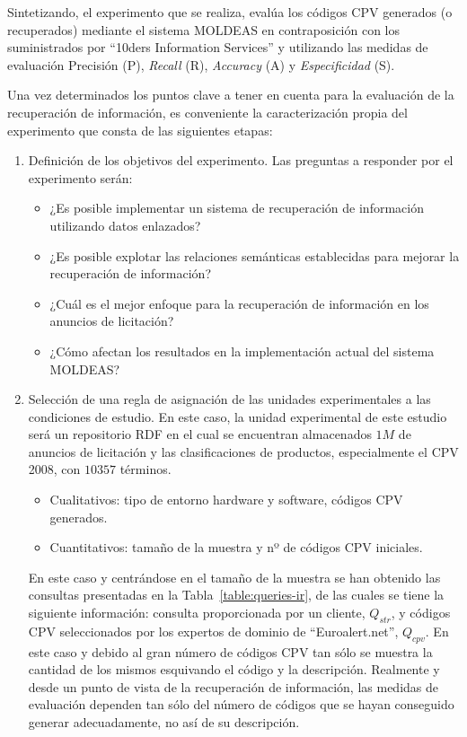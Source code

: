 Sintetizando, el experimento que se realiza, evalúa los códigos CPV generados (o recuperados) mediante el sistema MOLDEAS en contraposición 
con los suministrados por ``10ders Information Services'' y utilizando las medidas de evaluación Precisión (P), \textit{Recall} (R), \textit{Accuracy} (A) y 
\textit{Especificidad} (S).

Una vez determinados los puntos clave a tener en cuenta para la evaluación de la recuperación de información, es conveniente la caracterización 
propia del experimento que consta de las siguientes etapas:
\begin{enumerate}
 \item Definición de los objetivos del experimento. Las preguntas a responder por el experimento serán:
\begin{itemize}
 \item ¿Es posible implementar un sistema de recuperación de información utilizando datos enlazados?
 \item ¿Es posible explotar las relaciones semánticas establecidas para mejorar la recuperación de información?
 \item ¿Cuál es el mejor enfoque para la recuperación de información en los anuncios de licitación? 
 \item ¿Cómo afectan los resultados en la implementación actual del sistema \gls{MOLDEAS}?
\end{itemize}
 \item Selección de una regla de asignación de las unidades experimentales a las condiciones de estudio. En este caso, 
la unidad experimental de este estudio será un repositorio \gls{RDF} en el cual se encuentran almacenados $1M$ de anuncios de licitación y las clasificaciones de productos, especialmente el CPV 2008, con $10357$ términos. 
\begin{itemize}
 \item Cualitativos: tipo de entorno hardware y software, códigos CPV generados.
 \item Cuantitativos: tamaño de la muestra y nº de códigos \gls{CPV} iniciales.
\end{itemize}

En este caso y centrándose en el tamaño de la muestra se han obtenido las consultas presentadas en la Tabla~\ref{table:queries-ir}, de las 
cuales se tiene la siguiente información: consulta proporcionada por un cliente, $Q_{str}$, y códigos CPV seleccionados por los expertos 
de dominio de ``Euroalert.net'', $Q_{cpv}$. En este caso y debido al gran número de códigos CPV tan sólo se muestra la cantidad de los mismos esquivando 
el código y la descripción. Realmente y desde un punto de vista de la recuperación de información, las medidas de evaluación dependen 
tan sólo del número de códigos que se hayan conseguido generar adecuadamente, no así de su descripción.


\end{enumerate}
